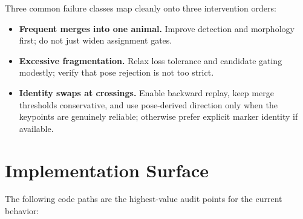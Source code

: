 \documentclass[11pt]{article}
\begin{document}
Three common failure classes map cleanly onto three intervention orders:

\begin{itemize}
  \item \textbf{Frequent merges into one animal.} Improve detection and morphology first; do not just widen assignment gates.
  \item \textbf{Excessive fragmentation.} Relax loss tolerance and candidate gating modestly; verify that pose rejection is not too strict.
  \item \textbf{Identity swaps at crossings.} Enable backward replay, keep merge thresholds conservative, and use pose-derived direction only when the keypoints are genuinely reliable; otherwise prefer explicit marker identity if available.
\end{itemize}

\section{Implementation Surface}

The following code paths are the highest-value audit points for the current behavior:
\end{document}
